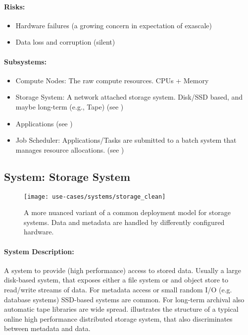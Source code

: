 \paragraph{Risks:}
\begin{itemize}
	\item Hardware failures (a growing concern in expectation of exascale)
	\item Data loss and corruption (silent)
\end{itemize}


\paragraph{Subsystems:}


\begin{itemize}
	\item Compute Nodes: The raw compute resources. CPUs + Memory
	\item Storage System: A network attached storage system. Disk/SSD based, and maybe long-term (e.g., Tape) (see )
	\item Applications (see )
	\item Job Scheduler: Applications/Tasks are submitted to a batch system that manages resource allocations. (see )
\end{itemize}



\subsection{System: Storage System}
\label{System: Storage System}

\begin{figure}
	\centering
	\texttt{[image: use-cases/systems/storage\_clean]}
	\caption{A more nuanced variant of a common deployment model for storage systems. Data and metadata are handled by differently configured hardware. }
	\label{fig:System: Storage System}
\end{figure}


\paragraph{System Description:}
A system to provide (high performance) access to stored data.
Usually a large disk-based system, that exposes either a file system or and object store to read/write streams of data.
For metadata access or small random I/O (e.g. database systems) SSD-based systems are common.
For long-term archival also automatic tape libraries are wide spread.
 illustrates the structure of a typical online high performance  distributed storage system, that also discriminates between metadata and data.

